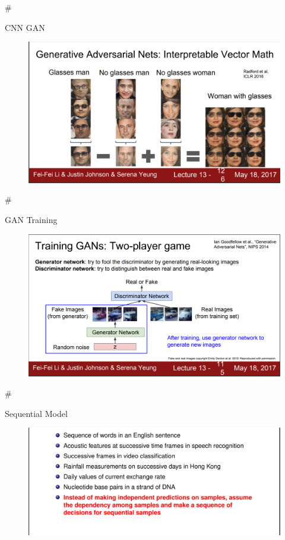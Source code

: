 \documentclass[11pt]{article}
\makeatletter
\def\maxwidth{\ifdim\Gin@nat@width>\linewidth\linewidth
    \else\Gin@nat@width\fi}
\let\Oldincludegraphics\includegraphics
\renewcommand{\includegraphics}[1]{\Oldincludegraphics[width=.8\maxwidth]{#1}}
\makeatother
\begin{document}
    \#

CNN GAN

\begin{figure}
\centering
\includegraphics{gan.png}
\caption{}
\end{figure}

    \#

GAN Training

\begin{figure}
\centering
\includegraphics{gan-training.png}
\caption{}
\end{figure}

    \#

Sequential Model

\begin{figure}
\centering
\includegraphics{sequence.png}
\caption{}
\end{figure}
\end{document}
